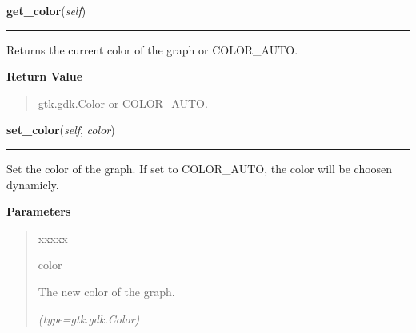     \vspace{0.5ex}

\hspace{.8\funcindent}\begin{boxedminipage}{\funcwidth}

    \raggedright \textbf{get\_color}(\textit{self})

    \vspace{-1.5ex}

    \rule{\textwidth}{0.5\fboxrule}
\setlength{\parskip}{2ex}
    Returns the current color of the graph or COLOR\_AUTO.

\setlength{\parskip}{1ex}
      \textbf{Return Value}
    \vspace{-1ex}

      \begin{quote}
      gtk.gdk.Color or COLOR\_AUTO.

      \end{quote}

    \end{boxedminipage}

    \label{pygtk_chart:line_chart:Graph:set_color}

    \vspace{0.5ex}

\hspace{.8\funcindent}\begin{boxedminipage}{\funcwidth}

    \raggedright \textbf{set\_color}(\textit{self}, \textit{color})

    \vspace{-1.5ex}

    \rule{\textwidth}{0.5\fboxrule}
\setlength{\parskip}{2ex}
    Set the color of the graph. If set to COLOR\_AUTO, the color will be 
    choosen dynamicly.

\setlength{\parskip}{1ex}
      \textbf{Parameters}
      \vspace{-1ex}

      \begin{quote}
        \begin{Ventry}{xxxxx}

          \item[color]

          The new color of the graph.

            {\it (type=gtk.gdk.Color)}

        \end{Ventry}

      \end{quote}

    \end{boxedminipage}

